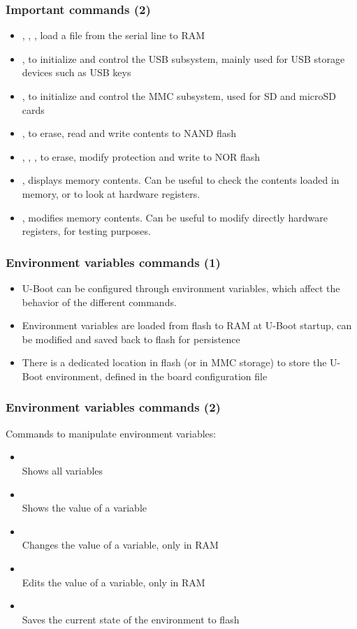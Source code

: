 \begin{frame}
  \frametitle{Important commands (2)}
  \begin{itemize}
  \item {}, , , load a file from the
    serial line to RAM
  \item {}, to initialize and control the USB subsystem,
    mainly used for USB storage devices such as USB keys
  \item {}, to initialize and control the MMC subsystem, used
    for SD and microSD cards
  \item {}, to erase, read and write contents to NAND flash
  \item {}, , , to erase, modify
    protection and write to NOR flash
  \item {}, displays memory contents. Can be useful to check the
    contents loaded in memory, or to look at hardware registers.
  \item {}, modifies memory contents. Can be useful to modify
    directly hardware registers, for testing purposes.
\end{itemize}
\end{frame}

\begin{frame}
  \frametitle{Environment variables commands (1)}
  \begin{itemize}
  \item U-Boot can be configured through environment variables, which
    affect the behavior of the different commands.
  \item Environment variables are loaded from flash to RAM at U-Boot
    startup, can be modified and saved back to flash for persistence
  \item There is a dedicated location in flash (or in MMC storage)
    to store the U-Boot environment, defined in the board configuration file
  \end{itemize}
\end{frame}

\begin{frame}
  \frametitle{Environment variables commands (2)}
  Commands to manipulate environment variables:
  \begin{itemize}
    \item {}\\
      Shows all variables
    \item {}\\
      Shows the value of a variable
    \item {}\\
      Changes the value of a variable, only in RAM
    \item {}\\
      Edits the value of a variable, only in RAM
    \item {}\\
      Saves the current state of the environment to flash
  \end{itemize}
\end{frame}

